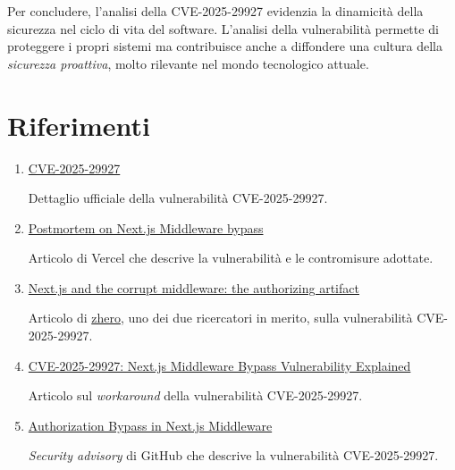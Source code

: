 \documentclass[a4paper,oneside,12pt]{report}
\begin{document}
Per concludere, l'analisi della CVE-2025-29927 evidenzia la dinamicit\`a della sicurezza nel ciclo di vita del software. L'analisi della vulnerabilit\`a permette di proteggere i propri sistemi ma contribuisce anche a diffondere una cultura della \textit{sicurezza proattiva}, molto rilevante nel mondo tecnologico attuale.

\chapter*{Riferimenti}
\label{chap:references}

\begin{enumerate}
	\item \href{https://nvd.nist.gov/vuln/detail/CVE-2025-29927}{CVE-2025-29927}

	Dettaglio ufficiale della vulnerabilità CVE-2025-29927.
	\item \href{https://vercel.com/blog/postmortem-on-next-js-middleware-bypass}{Postmortem on Next.js Middleware bypass}

	Articolo di Vercel che descrive la vulnerabilità e le contromisure adottate.
	\item \href{https://zhero-web-sec.github.io/research-and-things/nextjs-and-the-corrupt-middleware}{Next.js and the corrupt middleware: the authorizing artifact}

	Articolo di \href{https://x.com/zhero___}{zhero}, uno dei due ricercatori in merito, sulla vulnerabilità CVE-2025-29927.
	\item \href{https://www.picussecurity.com/resource/blog/cve-2025-29927-nextjs-middleware-bypass-vulnerability}{CVE-2025-29927: Next.js Middleware Bypass Vulnerability Explained}

	Articolo sul \textit{workaround} della vulnerabilità CVE-2025-29927.
	\item \href{https://github.com/vercel/next.js/security/advisories/GHSA-f82v-jwr5-mffw}{Authorization Bypass in Next.js Middleware}

	\emph{Security advisory} di GitHub che descrive la vulnerabilità CVE-2025-29927.
\end{enumerate}
\end{document}
